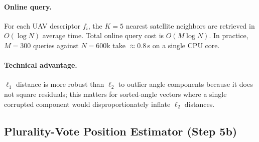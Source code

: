 \documentclass[10pt]{article}
\theoremstyle{plain}
\theoremstyle{definition}
\begin{document}
\paragraph{Online query.}
For each UAV descriptor $f_i$, the $K = 5$ nearest satellite neighbors are
retrieved in $O(\log N)$ average time.
Total online query cost is $O(M\log N)$.
In practice, $M=300$ queries against $N=600$k take ${\approx}0.8$\,s on a
single CPU core.

\paragraph{Technical advantage.}
$\ell_1$ distance is more robust than $\ell_2$ to outlier angle components because it
does not square residuals; this matters for sorted-angle vectors where a
single corrupted component would disproportionately inflate $\ell_2$ distances.

\subsection{Plurality-Vote Position Estimator (Step 5b)}
\label{sec:vote}
\end{document}
